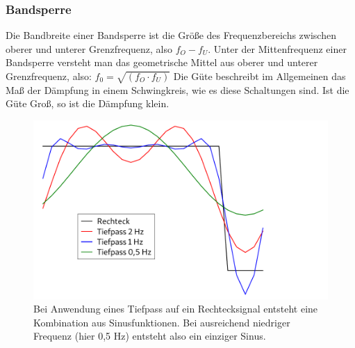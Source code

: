 \subsubsection{Bandsperre}
Die Bandbreite einer Bandsperre ist die Größe des Frequenzbereichs zwischen oberer und unterer Grenzfrequenz, also $f_O -f_U$.
Unter der Mittenfrequenz einer Bandsperre versteht man das geometrische Mittel aus oberer und unterer Grenzfrequenz, also: $f_0=\sqrt{(f_O·f_U)}$
Die Güte beschreibt im Allgemeinen das Maß der Dämpfung in einem Schwingkreis, wie es diese Schaltungen sind.
Ist die Güte Groß, so ist die Dämpfung klein.
\begin{figure}[H]
    \centering
    \includegraphics[width=1\textwidth]{Abb/rechtecktief.pdf} 
    \caption{Bei Anwendung eines Tiefpass auf ein Rechtecksignal entsteht eine Kombination aus Sinusfunktionen. Bei 
             ausreichend niedriger Frequenz (hier 0,5 Hz) entsteht also ein einziger Sinus.}
\end{figure}

